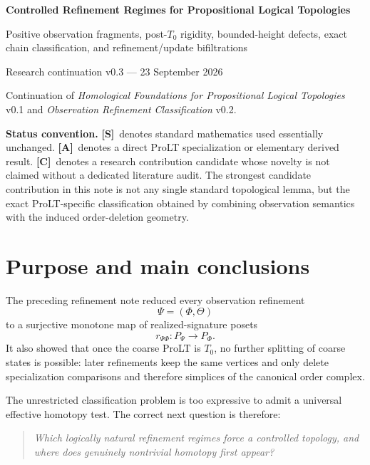 \documentclass[11pt]{article}
\theoremstyle{definition}
\newcommand{\statusS}{\textbf{[S]}}
\newcommand{\statusA}{\textbf{[A]}}
\newcommand{\statusC}{\textbf{[C]}}
\begin{document}
\begin{center}
{\LARGE\bfseries\color{navy} Controlled Refinement Regimes for Propositional Logical Topologies}\par
\vspace{0.35em}
{\large Positive observation fragments, post-$T_0$ rigidity, bounded-height defects, exact chain classification, and refinement/update bifiltrations}\par
\vspace{0.7em}
{\normalsize Research continuation v0.3 --- 23 September 2026}\par
\vspace{0.3em}
{\small Continuation of \emph{Homological Foundations for Propositional Logical Topologies} v0.1 and \emph{Observation Refinement Classification} v0.2.}
\end{center}

\vspace{0.8em}
\noindent\colorbox{softgold}{\parbox{0.96\textwidth}{
\textbf{Status convention.} \statusS\ denotes standard mathematics used essentially unchanged. \statusA\ denotes a direct ProLT specialization or elementary derived result. \statusC\ denotes a research contribution candidate whose novelty is not claimed without a dedicated literature audit. The strongest candidate contribution in this note is not any single standard topological lemma, but the exact ProLT-specific classification obtained by combining observation semantics with the induced order-deletion geometry.
}}

\section{Purpose and main conclusions}

The preceding refinement note reduced every observation refinement
\[
\Psi=(\Phi,\Theta)
\]
to a surjective monotone map of realized-signature posets
\[
r_{\Psi\Phi}:P_\Psi\longrightarrow P_\Phi.
\]
It also showed that once the coarse ProLT is $T_0$, no further splitting of coarse states is possible: later refinements keep the same vertices and only delete specialization comparisons and therefore simplices of the canonical order complex.

The unrestricted classification problem is too expressive to admit a universal effective homotopy test. The correct next question is therefore:

\begin{quote}
\emph{Which logically natural refinement regimes force a controlled topology, and where does genuinely nontrivial homotopy first appear?}
\end{quote}
\end{document}
